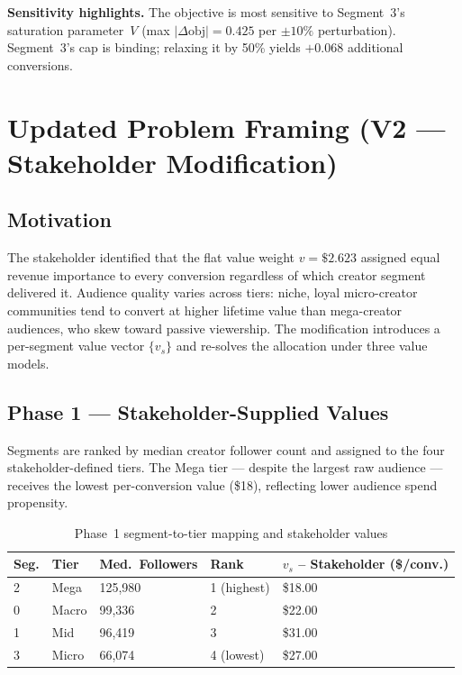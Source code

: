 \documentclass[11pt,letterpaper]{article}
\begin{document}
\textbf{Sensitivity highlights.} The objective is most sensitive to
Segment~3's saturation parameter~$V$ (max $|\Delta \text{obj}| = 0.425$
per $\pm 10\%$ perturbation). Segment~3's cap is binding; relaxing it by
50\% yields $+0.068$ additional conversions.

\newpage

\section{Updated Problem Framing (V2 --- Stakeholder Modification)}

\subsection{Motivation}

The stakeholder identified that the flat value weight $v = \$2.623$ assigned
equal revenue importance to every conversion regardless of which creator
segment delivered it. Audience quality varies across tiers: niche, loyal
micro-creator communities tend to convert at higher lifetime value than
mega-creator audiences, who skew toward passive viewership. The modification
introduces a per-segment value vector $\{v_s\}$ and re-solves the allocation
under three value models.

\subsection{Phase 1 --- Stakeholder-Supplied Values}

Segments are ranked by median creator follower count and assigned to the
four stakeholder-defined tiers. The Mega tier --- despite the largest raw
audience --- receives the lowest per-conversion value (\$18), reflecting
lower audience spend propensity.

\begin{table}[h!]
\centering
\caption{Phase~1 segment-to-tier mapping and stakeholder values}
\small
\begin{tabular}{C{0.8cm} C{1.1cm} R{2.0cm} R{2.4cm} R{2.8cm}}
\toprule
\textbf{Seg.} & \textbf{Tier} & \textbf{Med.\ Followers} &
\textbf{Rank} & \textbf{$v_s$ -- Stakeholder (\$/conv.)} \\
 & Mega  & 125{,}980 & 1 (highest) & \$18.00 \\
0 & Macro &  99{,}336 & 2           & \$22.00 \\
1 & Mid   &  96{,}419 & 3           & \$31.00 \\
3 & Micro &  66{,}074 & 4 (lowest)  & \$27.00 \\
\bottomrule
\end{tabular}
\end{table}
\end{document}
